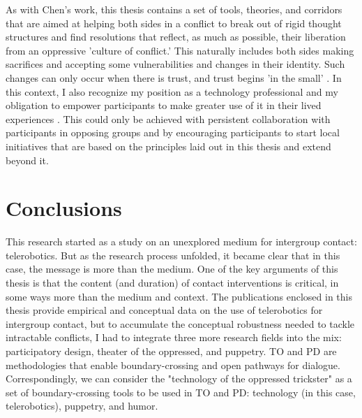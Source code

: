 \documentclass[dissertation,math,vertlayout,pdfa,colorlinks]{aaltoseries}
\begin{document}
As with Chen's work, this thesis contains a set of tools, theories, and corridors that are aimed at helping both sides in a conflict to break out of rigid thought structures and find resolutions that reflect, as much as possible, their liberation from an oppressive 'culture of conflict.' This naturally includes both sides making sacrifices and accepting some vulnerabilities and changes in their identity. Such changes can only occur when there is trust, and trust begins 'in the small' \cite{bodkerAfterthoughtsEmergentFuture2025, manziniDesignWhenEverybody2015}. In this context, I also recognize my position as a technology professional and my obligation to empower participants to make greater use of it in their lived experiences \cite{geppertDesignEquivalenceAgonism2022}. This could only be achieved with persistent collaboration with participants in opposing groups and by encouraging participants to start local initiatives that are based on the principles laid out in this thesis and extend beyond it.

\chapter{Conclusions}
This research started as a study on an unexplored medium for intergroup contact: telerobotics. But as the research process unfolded, it became clear that in this case, the message is more than the medium. One of the key arguments of this thesis is that the content (and duration) of contact interventions is critical, in some ways more than the medium and context. The publications enclosed in this thesis provide empirical and conceptual data on the use of telerobotics for intergroup contact, but to accumulate the conceptual robustness needed to tackle intractable conflicts, I had to integrate three more research fields into the mix: participatory design, theater of the oppressed, and puppetry. TO and PD are methodologies that enable boundary-crossing and open pathways for dialogue. Correspondingly, we can consider the "technology of the oppressed trickster" as a set of boundary-crossing tools to be used in TO and PD: technology (in this case, telerobotics), puppetry, and humor.
\end{document}
